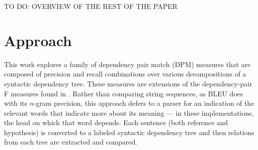 \documentclass{kluwer}    %
\begin{document}
\begin{article}
TO DO: OVERVIEW OF THE REST OF THE PAPER



\section{Approach}
\label{sec:approach}

This work explores a family of dependency pair match (DPM) measures
that are composed of precision and recall combinations over various
decompositions of a syntactic dependency tree. These measures are
extensions of the dependency-pair F measures found in
.  Rather than
comparing string sequences, as BLEU does with its $n$-gram precision,
this approach defers to a parser for an indication of the relevant
words that indicate more about its meaning --- in these
implementations, the head on which that word depends.  Each sentence
(both reference and hypothesis) is converted to a labeled syntactic
dependency tree and then relations from each tree are extracted and
compared.


\end{article}
\end{document}

